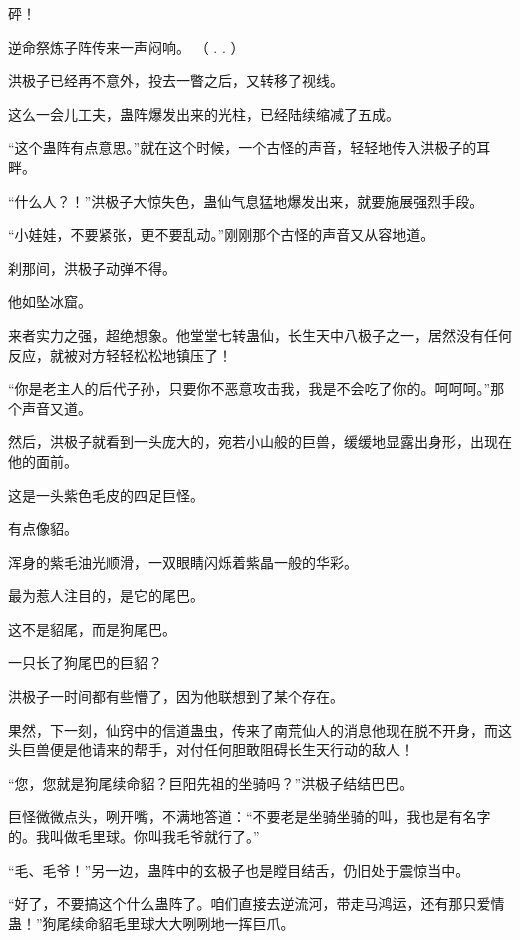 
\begin{this_body}

砰！

逆命祭炼子阵传来一声闷响。 （  .    .   ）

洪极子已经再不意外，投去一瞥之后，又转移了视线。

这么一会儿工夫，蛊阵爆发出来的光柱，已经陆续缩减了五成。

“这个蛊阵有点意思。”就在这个时候，一个古怪的声音，轻轻地传入洪极子的耳畔。

“什么人？！”洪极子大惊失色，蛊仙气息猛地爆发出来，就要施展强烈手段。

“小娃娃，不要紧张，更不要乱动。”刚刚那个古怪的声音又从容地道。

刹那间，洪极子动弹不得。

他如坠冰窟。

来者实力之强，超绝想象。他堂堂七转蛊仙，长生天中八极子之一，居然没有任何反应，就被对方轻轻松松地镇压了！

“你是老主人的后代子孙，只要你不恶意攻击我，我是不会吃了你的。呵呵呵。”那个声音又道。

然后，洪极子就看到一头庞大的，宛若小山般的巨兽，缓缓地显露出身形，出现在他的面前。

这是一头紫色毛皮的四足巨怪。

有点像貂。

浑身的紫毛油光顺滑，一双眼睛闪烁着紫晶一般的华彩。

最为惹人注目的，是它的尾巴。

这不是貂尾，而是狗尾巴。

一只长了狗尾巴的巨貂？

洪极子一时间都有些懵了，因为他联想到了某个存在。

果然，下一刻，仙窍中的信道蛊虫，传来了南荒仙人的消息他现在脱不开身，而这头巨兽便是他请来的帮手，对付任何胆敢阻碍长生天行动的敌人！

“您，您就是狗尾续命貂？巨阳先祖的坐骑吗？”洪极子结结巴巴。

巨怪微微点头，咧开嘴，不满地答道：“不要老是坐骑坐骑的叫，我也是有名字的。我叫做毛里球。你叫我毛爷就行了。”

“毛、毛爷！”另一边，蛊阵中的玄极子也是瞠目结舌，仍旧处于震惊当中。

“好了，不要搞这个什么蛊阵了。咱们直接去逆流河，带走马鸿运，还有那只爱情蛊！”狗尾续命貂毛里球大大咧咧地一挥巨爪。


\end{this_body}
